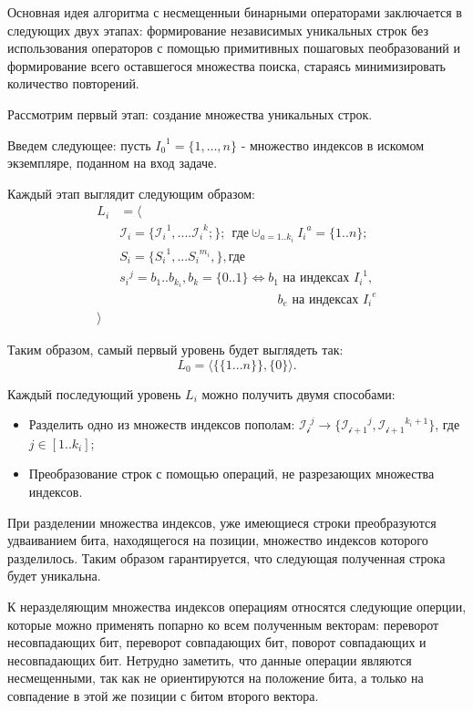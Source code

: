 \label{binary}

Основная идея алгоритма с несмещенныи бинарными операторами заключается в следующих двух этапах: формирование независимых уникальных строк без использования операторов 
с помощью примитивных пошаговых пеобразований и формирование всего оставшегося множества поиска, стараясь минимизировать количество повторений. 

Рассмотрим первый этап: создание множества уникальных строк.

Введем следующее: пусть ${I_0}^1 = \{1,\ldots, n\}$ - множество индексов в искомом экземпляре, поданном на вход задаче. 

Каждый этап выглядит следующим образом: 
\begin{align*}
L_i &= \langle \\
&\mathcal{I}_i = \{{\mathcal{I}_{i}}^{1},....{\mathcal{I}_{i}}^{k};\}; \:\: \textrm{где}  \cupdot_{a = 1..k_i} {I_i}^a = \{ 1..n \}; \\
& S_i = \{ {S_i}^1, ... {S_i}^{m_i}, \}, \textrm{где}  \\ 
&{s_i}^j = b_1..b_{k_i}, b_k = \{ 0..1  \}  \Longleftrightarrow b_1 \textrm{ на индексах } {I_{i}}^1, \\ 
& \:\:\:\:\:\:\:\:\:\:\:\:\:\:\:\:\:\:\:\:\:\:\:\:\:\:\:\:\:\:\:\:\:\:\:\:\:\:\:\:\:\:\:\:\:\:\:\:\:\:\:\:\:\:\:\: b_e \textrm{ на индексах } {I_{i}}^e\\
\rangle
\end{align*}

Таким образом, самый первый уровень будет выглядеть так: 
$$L_0 = \langle \{\{ 1...n \}\}, \{0\} \rangle.$$

Каждый последующий уровень $L_i$ можно получить двумя способами: 
\begin{itemize}
   \item Разделить одно из множеств индексов пополам: $ \mathcal{{I}_i}^j \to \{\mathcal{{I}_{i+1}}^j, \mathcal{{I}_{i+1}}^{k_i+1}\} $, где $j \in [1..k_i]$;
   \item Преобразование строк с помощью операций, не разрезающих множества индексов.
\end{itemize}

При разделении множества индексов, уже имеющиеся строки преобразуются удваиванием бита, находящегося на позиции, множество индексов которого разделилось.
Таким образом гарантируется, что следующая полученная строка будет уникальна.

К неразделяющим множества индексов операциям относятся следующие оперции, которые можно применять попарно ко всем полученным векторам: 
переворот несовпадающих бит, переворот совпадающих бит, поворот совпадающих и несовпадающих бит. 
Нетрудно заметить, что данные операции являются несмещенными, так как не ориентируются на положение бита, а только на совпадение в этой же позиции с битом второго вектора. 

